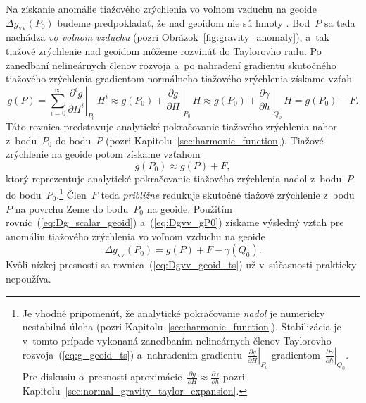 \documentclass[a4paper, 12pt]{book}
\begin{document}
Na získanie anomálie tiažového zrýchlenia vo voľnom vzduchu na geoide~$\Delta 
g_{\mathrm{vv}}(P_0)$ budeme predpokladať, že nad geoidom nie sú hmoty 
\parencite{MoritzPhysicalGeodesy}.  Bod~$P$ sa teda nachádza \emph{vo voľnom 
vzduchu} (pozri Obrázok~\ref{fig:gravity_anomaly}), a~tak tiažové zrýchlenie 
nad geoidom môžeme rozvinúť do Taylorovho radu.  Po zanedbaní nelineárnych 
členov rozvoja a~po nahradení gradientu skutočného tiažového zrýchlenia 
gradientom normálneho tiažového zrýchlenia získame vzťah
%
\begin{equation}
\label{eq:g_geoid_ts}
g(P) = \sum_{i = 0}^{\infty} \left.\frac{\partial^i g}{\partial 
H^i}\right|_{P_0} \, H^i \approx g(P_0) + \left.\frac{\partial g}{\partial 
H}\right|_{P_0} \, H \approx g(P_0) + \left.\frac{\partial \gamma}{\partial 
h}\right|_{Q_0} \, H = g(P_0) - F{.}
\end{equation}
%
Táto rovnica predstavuje analytické pokračovanie tiažového zrýchlenia nahor 
z~bodu~$P_0$ do bodu~$P$ (pozri Kapitolu~\ref{sec:harmonic_function}).  Tiažové 
zrýchlenie na geoide potom získame vzťahom
%
\begin{equation}
\label{eq:Dgvv_gP0}
g(P_0) \approx g(P) + F{,}
\end{equation}
%
ktorý reprezentuje analytické pokračovanie tiažového zrýchlenia nadol 
z~bodu~$P$ do bodu~$P_0$.\footnote{\label{fn:Dgvv_P0_dc}Je vhodné pripomenúť, 
že analytické pokračovanie \emph{nadol} je numericky nestabilná úloha (pozri 
Kapitolu~\ref{sec:harmonic_function}).  Stabilizácia je v~tomto prípade 
vykonaná zanedbaním nelineárnych členov Taylorovho 
rozvoja~(\ref{eq:g_geoid_ts}) a~nahradením gradientu~$\left.\frac{\partial 
g}{\partial H}\right|_{P_0}$ gradientom~$\left.\frac{\partial \gamma}{\partial 
h}\right|_{Q_0}$.  Pre diskusiu o~presnosti aproximácie~$\frac{\partial 
g}{\partial H} \approx \frac{\partial \gamma}{\partial h}$ pozri 
Kapitolu~\ref{sec:normal_gravity_taylor_expansion}.}  Člen~$F$ teda 
\emph{približne} redukuje skutočné tiažové zrýchlenie z~bodu~$P$ na povrchu 
Zeme do bodu~$P_0$ na geoide.  Použitím rovníc~(\ref{eq:Dg_scalar_geoid}) 
a~(\ref{eq:Dgvv_gP0}) získame výsledný vzťah pre anomáliu tiažového zrýchlenia 
vo voľnom vzduchu na geoide
%
\begin{equation}
\label{eq:Dgvv_geoid_ts}
\Delta g_\mathrm{vv}(P_0) = g(P) + F - \gamma(Q_0){.}
\end{equation}
%
Kvôli nízkej presnosti sa rovnica~(\ref{eq:Dgvv_geoid_ts}) už v~súčasnosti 
prakticky nepoužíva.
\end{document}
